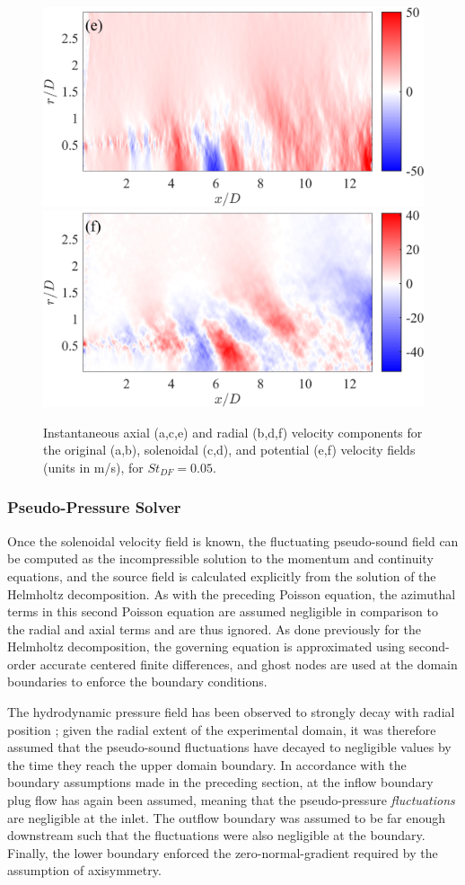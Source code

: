 \begin{figure}
		\includegraphics[width=0.45\linewidth]{Figures/ch5_valid_Inst_potUz_v2.png}
		\includegraphics[width=0.45\linewidth]{Figures/ch5_valid_Inst_potUr_v2.png}
	\caption{Instantaneous axial (a,c,e) and radial (b,d,f) velocity components for the original (a,b), solenoidal (c,d), and potential (e,f) velocity fields (units in m/s), for $St_{DF} = 0.05.$}
	\label{fig:valid_helmholtz}
\end{figure}

\subsubsection{Pseudo-Pressure Solver}
Once the solenoidal velocity field is known, the fluctuating pseudo-sound field can be computed as the incompressible solution to the momentum and continuity equations, and the source field is calculated explicitly from the solution of the Helmholtz decomposition.
As with the preceding Poisson equation, the azimuthal terms in this second Poisson equation are assumed negligible in comparison to the radial and axial terms and are thus ignored.
As done previously for the Helmholtz decomposition, the governing equation is approximated using second-order accurate centered finite differences, and ghost nodes are used at the domain boundaries to enforce the boundary conditions.

The hydrodynamic pressure field has been observed to strongly decay with radial position \citep{Arndt1997}; given the radial extent of the experimental domain, it was therefore assumed that the pseudo-sound fluctuations have decayed to negligible values by the time they reach the upper domain boundary.
In accordance with the boundary assumptions made in the preceding section, at the inflow boundary plug flow has again been assumed, meaning that the pseudo-pressure \textit{fluctuations} are negligible at the inlet. 
The outflow boundary was assumed to be far enough downstream such that the fluctuations were also negligible at the boundary.
Finally, the lower boundary enforced the zero-normal-gradient required by the assumption of axisymmetry.


